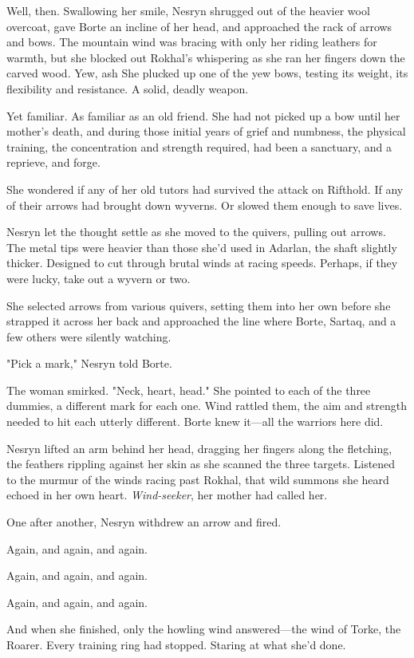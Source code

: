 Well, then. Swallowing her smile, Nesryn shrugged out of the heavier wool overcoat, gave Borte an incline of her head, and approached the rack of arrows and bows. The mountain wind was bracing with only her riding leathers for warmth, but she blocked out Rokhal's whispering as she ran her fingers down the carved wood. Yew, ash  She plucked up one of the yew bows, testing its weight, its flexibility and resistance. A solid, deadly weapon.

Yet familiar. As familiar as an old friend. She had not picked up a bow until her mother's death, and during those initial years of grief and numbness, the physical training, the concentration and strength required, had been a sanctuary, and a reprieve, and forge.

She wondered if any of her old tutors had survived the attack on Rifthold. If any of their arrows had brought down wyverns. Or slowed them enough to save lives.

Nesryn let the thought settle as she moved to the quivers, pulling out arrows. The metal tips were heavier than those she'd used in Adarlan, the shaft slightly thicker. Designed to cut through brutal winds at racing speeds. Perhaps, if they were lucky, take out a wyvern or two.

She selected arrows from various quivers, setting them into her own before she strapped it across her back and approached the line where Borte, Sartaq, and a few others were silently watching.

"Pick a mark," Nesryn told Borte.

The woman smirked. "Neck, heart, head." She pointed to each of the three dummies, a different mark for each one. Wind rattled them, the aim and strength needed to hit each utterly different. Borte knew it---all the warriors here did.

Nesryn lifted an arm behind her head, dragging her fingers along the fletching, the feathers rippling against her skin as she scanned the three targets. Listened to the murmur of the winds racing past Rokhal, that wild summons she heard echoed in her own heart. \emph{Wind-seeker}, her mother had called her.

One after another, Nesryn withdrew an arrow and fired.

Again, and again, and again.

Again, and again, and again.

Again, and again, and again.

And when she finished, only the howling wind answered---the wind of Torke, the Roarer. Every training ring had stopped. Staring at what she'd done.

